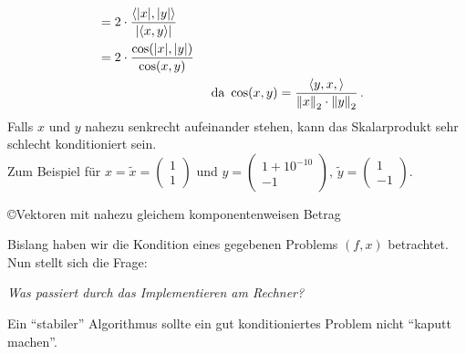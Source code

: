 \begin{Bspe}
\begin{enumerate}[a)]
\begin{align*}
                                                         &= 2\cdot \frac{\langle |x|,|y|\rangle}{|\langle x,y\rangle|} \\
                                                         &= 2 \cdot \frac{\cos(|x|, |y|)}{\cos(x,y)}  \\
                                                         &&&				\text{	da  }\cos(x,y) = \frac{\scp{y,x}}{\nn[x]_2 \cdot \nn[y]_2} \, . 
    \end{align*}
    Falls $x$ und $y$ nahezu senkrecht aufeinander stehen, kann das Skalarprodukt sehr schlecht konditioniert sein. \\
    Zum Beispiel für $x=\widetilde{x} = \begin{pmatrix} 1 \\1 \end{pmatrix}$
    und $y=\begin{pmatrix} 1+10^{-10} \\-1 \end{pmatrix},
    \, \widetilde{y}=\begin{pmatrix} 1 \\-1 \end{pmatrix}$. \\
    \begin{image}{\copyright Vektoren mit nahezu gleichem komponentenweisen Betrag}
    \end{image}
  \end{enumerate}	
\end{Bspe}

Bislang haben wir die Kondition eines gegebenen Problems $(f,x)$ betrachtet.
Nun stellt sich die Frage:

\textit{Was passiert durch das Implementieren am Rechner? }

Ein \enquote{stabiler} Algorithmus sollte ein gut konditioniertes
Problem nicht \enquote{kaputt machen}.

